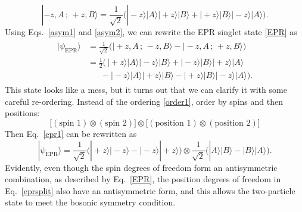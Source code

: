 \documentclass[pra,12pt]{revtex4}
\begin{document}
\begin{equation}
  |-\!z, A\,;\, +z, B\rangle = \frac{1}{\sqrt{2}}
  \Big(|\!-\!z\rangle|A\rangle |\!+\!z\rangle|B\rangle
  + |\!+\!z\rangle|B\rangle |\!-\!z\rangle|A\rangle \Big).
  \label{asym2}
\end{equation}
Using Eqs.~\eqref{asym1} and \eqref{asym2}, we can rewrite the EPR
singlet state \eqref{EPR} as
\begin{align}
  \begin{aligned}
    |\psi_{\mathrm{EPR}}\rangle &= \frac{1}{\sqrt{2}} \Big(
    |\!+\!z, A\,;\, -z, B\rangle - |-\!z, A\,;\, +z, B\rangle \Big)\\
    &= \frac{1}{2} \Big(\,
    |\!+\!z\rangle|A\rangle |\!-\!z\rangle|B\rangle
    + |\!-\!z\rangle|B\rangle |\!+\!z\rangle|A\rangle \\
    &\quad\;\;- |\!-\!z\rangle|A\rangle |\!+\!z\rangle|B\rangle
    - |\!+\!z\rangle|B\rangle |\!-\!z\rangle|A\rangle \Big).
    \label{epr1}
  \end{aligned}
\end{align}
This state looks like a mess, but it turns out that we can clarify it
with some careful re-ordering.  Instead of the ordering
\eqref{order1}, order by spins and then positions:
\begin{equation}
  \Big[
    (\textrm{spin 1}) \otimes (\textrm{spin 2}) \Big]
  \otimes
  \Big[
    (\textrm{position 1}) \otimes (\textrm{position 2}) \Big]
  \label{order2}
\end{equation}
Then Eq.~\eqref{epr1} can be rewritten as
\begin{equation}
  |\psi_{\mathrm{EPR}}\rangle = \frac{1}{\sqrt{2}} \Big(
  |\!+\!z\rangle |\!-\!z\rangle - |\!-\!z\rangle |\!+\!z\rangle \Big)  
  \otimes \frac{1}{\sqrt{2}} \Big(
  |A\rangle |B\rangle - |B\rangle |A\rangle \Big).
  \label{eprsplit}
\end{equation}
Evidently, even though the spin degrees of freedom form an
antisymmetric combination, as described by Eq.~\eqref{EPR}, the
position degrees of freedom in Eq.~\eqref{eprsplit} also have an
antisymmetric form, and this allows the two-particle state to meet the
bosonic symmetry condition.
\end{document}

